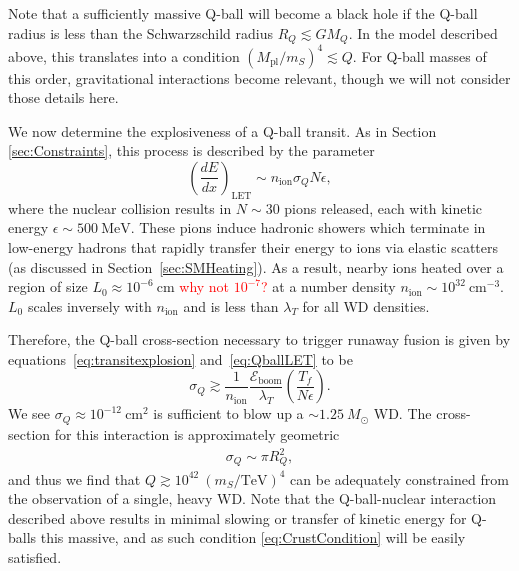 \documentclass[twocolumn,preprintnumbers,amsmath,amssymb,prd, superscriptaddress]{revtex4} %
\newcommand{\Eboom}{\mathcal{E}_\text{boom}}
\def\r{\right)}
\def\l{\left(}
\begin{document}
Note that a sufficiently massive Q-ball will become a black hole if the Q-ball radius is less than the Schwarzschild radius $R_Q \lesssim G M_Q$.
In the model described above, this translates into a condition $(M_\text{pl}/m_S)^4 \lesssim Q$.
For Q-ball masses of this order, gravitational interactions become relevant, though we will not consider those details here.

We now determine the explosiveness of a Q-ball transit.
As in Section \ref{sec:Constraints}, this process is described by the parameter
\begin{equation}
\label{eq:QballLET}
\l\frac{dE}{dx}\r_\text{LET} \sim n_\text{ion} \sigma_Q N \epsilon,
\end{equation}
where the nuclear collision results in $N \sim 30$ pions released, each with kinetic energy $\epsilon \sim 500 ~\text{MeV}$.
These pions induce hadronic showers which terminate in low-energy hadrons that rapidly transfer their energy to ions via elastic scatters (as discussed in Section~\ref{sec:SMHeating}).
As a result, nearby ions heated over a region of size $L_0 \approx 10^{-6} ~\text{cm}$ \textcolor{red}{why not $10^{-7}$?} at a number density $n_\text{ion} \sim 10^{32}~\text{cm}^{-3}$.
$L_0$ scales inversely with $n_\text{ion}$ and is less than $\lambda_T$ for all WD densities.

Therefore, the Q-ball cross-section necessary to trigger runaway fusion is given by equations~\eqref{eq:transitexplosion} and~\eqref{eq:QballLET} to be
\begin{equation}
\sigma_Q \gtrsim \frac{1}{n_\text{ion}} \frac{\Eboom}{\lambda_T} \l \frac{T_f}{N \epsilon} \r.
\end{equation}
We see $\sigma_Q \approx 10^{-12} ~\text{cm}^2$ is sufficient to blow up a $\sim 1.25 ~M_{\odot}$ WD.
The cross-section for this interaction is approximately geometric
\begin{align}
\sigma_Q \sim \pi R_Q^2,
\end{align}
and thus we find that $Q \gtrsim 10^{42} ~(m_S/\text{TeV})^4$ can be adequately constrained from the observation of a single, heavy WD.
Note that the Q-ball-nuclear interaction described above results in minimal slowing or transfer of kinetic energy for Q-balls this massive, and as such condition \eqref{eq:CrustCondition} will be easily satisfied.
\end{document}
